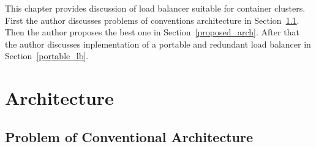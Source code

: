This chapter provides discussion of load balancer suitable for container clusters.
First the author discusses problems of conventions architecture in Section~\ref{problem_k8s}.
Then the author proposes the best one in Section~\ref{proposed_arch}.
After that the author discusses inplementation of  a portable and redundant load balancer in Section~\ref{portable_lb}. 

\section{Architecture}

\subsection{Problem of Conventional Architecture}\label{problem_k8s}

